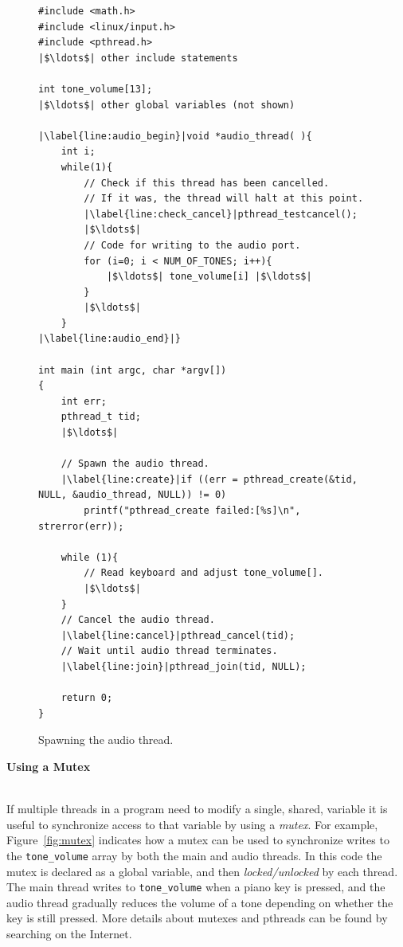 \documentclass[epsfig,10pt,fullpage]{article}
\begin{document}
\lstset{language=C,numbers=left,escapechar=|}
\begin{figure}[H]
\begin{center}
\begin{minipage}[t]{14.75 cm}
\begin{lstlisting}
#include <math.h>
#include <linux/input.h>
#include <pthread.h>
|$\ldots$| other include statements

int tone_volume[13];
|$\ldots$| other global variables (not shown)

|\label{line:audio_begin}|void *audio_thread( ){
	int i;
	while(1){
	    // Check if this thread has been cancelled.
	    // If it was, the thread will halt at this point.
	    |\label{line:check_cancel}|pthread_testcancel();
	    |$\ldots$|
	    // Code for writing to the audio port.
	    for (i=0; i < NUM_OF_TONES; i++){
	        |$\ldots$| tone_volume[i] |$\ldots$|
	    }
	    |$\ldots$|
	}
|\label{line:audio_end}|}

int main (int argc, char *argv[])
{
	int err;
	pthread_t tid;
	|$\ldots$|

	// Spawn the audio thread.
	|\label{line:create}|if ((err = pthread_create(&tid, NULL, &audio_thread, NULL)) != 0)
	    printf("pthread_create failed:[%s]\n", strerror(err));

	while (1){
	    // Read keyboard and adjust tone_volume[].
	    |$\ldots$|
	}
	// Cancel the audio thread.
	|\label{line:cancel}|pthread_cancel(tid);
	// Wait until audio thread terminates.
	|\label{line:join}|pthread_join(tid, NULL);

	return 0;
}
\end{lstlisting}
\end{minipage}
\end{center}
\vspace{-0.33in}\caption{Spawning the audio thread.}
\label{fig:pthread_code}
\end{figure}

\newpage
\noindent
{\bf Using a Mutex}

~\\
\noindent
If multiple threads in a program need to modify a single, shared, variable it is useful to 
synchronize access to that variable by using a {\it mutex}. For example, 
Figure~\ref{fig:mutex} indicates how a mutex can be used to synchronize writes to the 
\texttt{tone\_volume} array by both the main and audio threads. In this code the mutex is
declared as a global variable, and then {\it locked/unlocked} by each thread. The main
thread writes to \texttt{tone\_volume} when a piano key is pressed, and the audio
thread gradually reduces the volume of a tone depending on whether the key is still pressed.
More details about mutexes and pthreads can be found by searching on the Internet.
\end{document}
